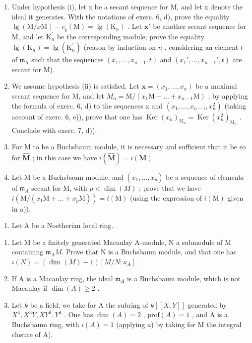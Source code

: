 \begin{enumerate}
\def\labelenumi{\alph{enumi})}
\item
  Under hypothesis (i), let x be a secant sequence for M, and let x denote the ideal it generates. With the notations of exerc. 6, d), prove the equality \(\lg(\mathrm{M}/x\mathrm{M}) - e_{\mathfrak{x}}(\mathrm{M}) = \lg(\mathrm{K}_{n})\) . Let \(\mathbf{x}'\) be another secant sequence for M, and let \(\mathrm{K}_{n}^{\prime}\) be the corresponding module; prove the equality \(\lg(\mathrm{K}_{n}) = \lg(\mathrm{K}_{n}^{\prime})\) (reason by induction on \(n\) , considering an element \(t\) of \(\mathfrak{m}_{\mathrm{A}}\) such that the sequences \((x_{1},\ldots,x_{n-1},t)\) and \((x_{1}',\ldots,x_{n-1}',t)\) are secant for M).
\item
  We assume hypothesis (ii) is satisfied. Let \(\mathbf{x} = (x_{1}, \ldots, x_{n})\) be a maximal secant sequence for M, and let \(M_{n} = \mathrm{M}/(x_{1}\mathrm{M} + \ldots + x_{n-1}\mathrm{M})\) ; by applying the formula of exerc. 6, d) to the sequences x and \((x_{1}, \ldots, x_{n-1}, x_{n}^{2})\) (taking account of exerc. 6, e)), prove that one has \(\operatorname{Ker}(x_{n})_{\mathrm{M}_{n}} = \operatorname{Ker}(x_{n}^{2})_{\mathrm{M}_{n}}\) . Conclude with exerc. 7, d)).
\item
  For M to be a Buchsbaum module, it is necessary and sufficient that it be so for \(\widehat{\mathbf{M}}\) ; in this case we have \(i(\widehat{\mathbf{M}}) = i(\mathbf{M})\) .
\item
  Let M be a Buchsbaum module, and \((x_{1},\ldots,x_{p})\) be a sequence of elements of \(\mathfrak{m}_{A}\) secant for M, with \(p<\dim(M)\) ; prove that we have \(i(\mathrm{M}/(x_{1}\mathrm{M}+\ldots+x_{p}\mathrm{M}))=i(\mathrm{M})\) (using the expression of \(i(\mathrm{M})\) given in a)).
\end{enumerate}

\begin{enumerate}
\def\labelenumi{\arabic{enumi})}
\setcounter{enumi}{8}
\tightlist
\item
  Let A be a Noetherian local ring.
\end{enumerate}

\begin{enumerate}
\def\labelenumi{\alph{enumi})}
\item
  Let M be a finitely generated Macaulay A-module, N a submodule of M containing \(\mathfrak{m}_{A}M\). Prove that N is a Buchsbaum module, and that one has \(i(N) = (\dim(M) - 1)[M/N : \kappa_{A}]\) .
\item
  If A is a Macaulay ring, the ideal \(\mathfrak{m}_{A}\) is a Buchsbaum module, which is not Macaulay if \(\dim(A) \geqslant 2\) .
\item
  Let \(k\) be a field; we take for A the subring of \(k[[X,Y]]\) generated by \(X^4, X^3Y, XY^3, Y^4\) . One has \(\dim(A) = 2\) , \(\text{prof}(A) = 1\) , and A is a Buchsbaum ring, with \(i(A) = 1\) (applying \(a\)) by taking for M the integral closure of A).
\end{enumerate}

